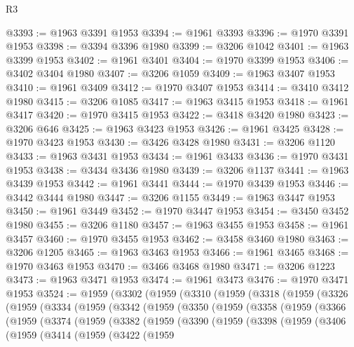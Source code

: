 \begin{lexlean}{R3}
\begin{coremodule}
@3393 := @1963 @3391 @1953
@3394 := @1961 @3393
@3396 := @1970 @3391 @1953
@3398 := @3394 @3396 @1980
@3399 := @3206 @1042
@3401 := @1963 @3399 @1953
@3402 := @1961 @3401
@3404 := @1970 @3399 @1953
@3406 := @3402 @3404 @1980
@3407 := @3206 @1059
@3409 := @1963 @3407 @1953
@3410 := @1961 @3409
@3412 := @1970 @3407 @1953
@3414 := @3410 @3412 @1980
@3415 := @3206 @1085
@3417 := @1963 @3415 @1953
@3418 := @1961 @3417
@3420 := @1970 @3415 @1953
@3422 := @3418 @3420 @1980
@3423 := @3206 @646
@3425 := @1963 @3423 @1953
@3426 := @1961 @3425
@3428 := @1970 @3423 @1953
@3430 := @3426 @3428 @1980
@3431 := @3206 @1120
@3433 := @1963 @3431 @1953
@3434 := @1961 @3433
@3436 := @1970 @3431 @1953
@3438 := @3434 @3436 @1980
@3439 := @3206 @1137
@3441 := @1963 @3439 @1953
@3442 := @1961 @3441
@3444 := @1970 @3439 @1953
@3446 := @3442 @3444 @1980
@3447 := @3206 @1155
@3449 := @1963 @3447 @1953
@3450 := @1961 @3449
@3452 := @1970 @3447 @1953
@3454 := @3450 @3452 @1980
@3455 := @3206 @1180
@3457 := @1963 @3455 @1953
@3458 := @1961 @3457
@3460 := @1970 @3455 @1953
@3462 := @3458 @3460 @1980
@3463 := @3206 @1205
@3465 := @1963 @3463 @1953
@3466 := @1961 @3465
@3468 := @1970 @3463 @1953
@3470 := @3466 @3468 @1980
@3471 := @3206 @1223
@3473 := @1963 @3471 @1953
@3474 := @1961 @3473
@3476 := @1970 @3471 @1953
@3524 := @1959
    (@3302
      (@1959
        (@3310
          (@1959
            (@3318
              (@1959
                (@3326
                  (@1959
                    (@3334
                      (@1959
                        (@3342
                          (@1959
                            (@3350
                              (@1959
                                (@3358
                                  (@1959
                                    (@3366
                                      (@1959
                                        (@3374
                                          (@1959
                                            (@3382
                                              (@1959
                                                (@3390
                                                  (@1959
                                                    (@3398
                                                      (@1959
                                                        (@3406
                                                          (@1959
                                                            (@3414
                                                              (@1959
                                                                (@3422
                                                                  (@1959

\end{coremodule}
\end{lexlean}
